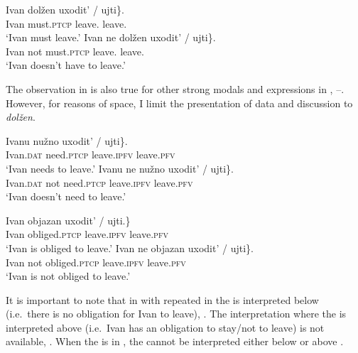 \documentclass[output=paper,newtxmath,colorlinks,citecolor=brown]{langsci/langscibook}
\begin{document}
\ea	\label{ar} \ea \gll Ivan dolžen \minsp{\{} uxodit' / ujti\}.\\
	Ivan must.\textsc{ptcp} {} {leave.\im} {} leave.\p {}\\
	\glt `Ivan must leave.' \label{arpos}
	\ex  \gll Ivan ne dolžen \minsp{\{} uxodit' / \minsp{*} ujti\}.\\
    Ivan  not must.\textsc{ptcp} {} {leave.\im} {} {} leave.\p {}\\
	\glt `Ivan doesn't have to leave.' \\ \label{arneg}
	\z \z

\noindent The observation in  is also true for other strong  modals and  expressions in , --. However, for reasons of space, I limit the presentation of  data and discussion to \textit{dolžen}.

\ea \label{nuzhno}	\ea \gll Ivanu nu\v zno \minsp{\{} uxodit' / ujti\}.\\
	Ivan.\textsc{dat} need.\textsc{ptcp} {} leave.\textsc{ipfv} {} leave.\textsc{pfv} {} \\
    \glt `Ivan needs to leave.'
	\ex \gll Ivanu ne nu\v zno \minsp{\{} uxodit' / \minsp{*} ujti\}. \\
	Ivan.\textsc{dat} not need.\textsc{ptcp} {} leave.\textsc{ipfv} {} {}  leave.\textsc{pfv} {}  \\
    \glt `Ivan doesn't need to leave.'
	\z \z

\ea \label{objazan}	\ea \gll Ivan objazan  uxodit' / ujti.\}\\
	Ivan obliged.\textsc{ptcp} {} leave.\textsc{ipfv} {} leave.\textsc{pfv} {} \\
	\glt `Ivan is obliged to leave.'
	\ex \gll Ivan ne objazan \minsp{\{} uxodit' / \minsp{*} ujti\}. \\
	Ivan not obliged.\textsc{ptcp} {} leave.\textsc{ipfv} {} {} leave.\textsc{pfv} {} \\
	\glt `Ivan is not obliged to leave.'
	\z \z

\noindent It is important to note that in  with \im repeated in  the   is interpreted below  (i.e.\ there is no obligation for Ivan to leave), . The interpretation where the  is interpreted above  (i.e.\ Ivan has an obligation to stay/not to leave) is not available, . When the  is \p in , the  cannot be interpreted either below or above .
\end{document}
